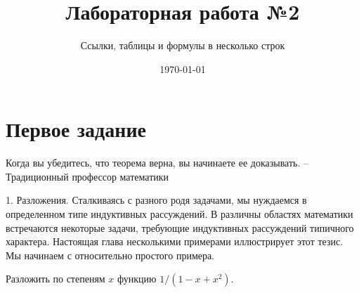 \documentclass[a4paper,12pt]{article} %
\author{Ссылки, таблицы и формулы в несколько строк}
\title{Лабораторная работа №2}
\date{\today}
\begin{document}
	
	\maketitle %
	
	\section{Первое задание}	
	Когда вы убедитесь, что теорема верна, вы начинаете ее доказывать. -- Традиционный профессор математики
	
	1. Разложения. Сталкиваясь с разного родя задачами, мы нуждаемся в определенном типе индуктивных рассуждений. В различны областях математики встречаются некоторые задачи, требующие индуктивных рассуждений типичного характера. Настоящая глава несколькими примерами иллюстрирует этот тезис. Мы начинаем с относительно простого примера.
	
	Разложить по степеням $x$ функцию $1 / \left(1 - x + x^2 \right).$
	
\end{document}
